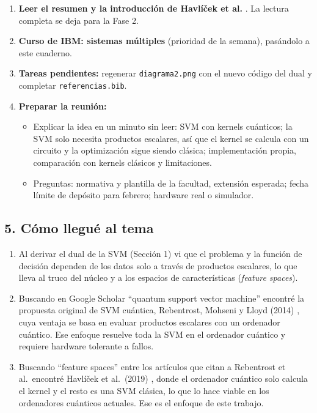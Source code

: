 \documentclass[12pt, a4paper]{article}
\begin{document}
\begin{enumerate}
    \item \textbf{Leer el resumen y la introducción de Havlíček et al.} \cite{havlicek2019supervised}. La lectura completa se deja para la Fase 2.
    \item \textbf{Curso de IBM: sistemas múltiples} (prioridad de la semana), pasándolo a este cuaderno.
    \item \textbf{Tareas pendientes:} regenerar \texttt{diagrama2.png} con el nuevo código del dual y completar \texttt{referencias.bib}.
    \item \textbf{Preparar la reunión:}
    \begin{itemize}
        \item Explicar la idea en un minuto sin leer: SVM con kernels cuánticos; la SVM solo necesita productos escalares, así que el kernel se calcula con un circuito y la optimización sigue siendo clásica; implementación propia, comparación con kernels clásicos y limitaciones.
        \item Preguntas: normativa y plantilla de la facultad, extensión esperada; fecha límite de depósito para febrero; hardware real o simulador.
    \end{itemize}
\end{enumerate}

\subsection*{5. Cómo llegué al tema}

\begin{enumerate}
    \item Al derivar el dual de la SVM (Sección 1) vi que el problema y la función de decisión dependen de los datos solo a través de productos escalares, lo que lleva al truco del núcleo y a los espacios de características (\textit{feature spaces}).
    \item Buscando en Google Scholar ``quantum support vector machine'' encontré la propuesta original de SVM cuántica, Rebentrost, Mohseni y Lloyd (2014) \cite{rebentrost2014quantum}, cuya ventaja se basa en evaluar productos escalares con un ordenador cuántico. Ese enfoque resuelve toda la SVM en el ordenador cuántico y requiere hardware tolerante a fallos.
    \item Buscando ``feature spaces'' entre los artículos que citan a Rebentrost et al.\ encontré Havlíček et al.\ (2019) \cite{havlicek2019supervised}, donde el ordenador cuántico solo calcula el kernel y el resto es una SVM clásica, lo que lo hace viable en los ordenadores cuánticos actuales. Ese es el enfoque de este trabajo.
\end{enumerate}
\end{document}
